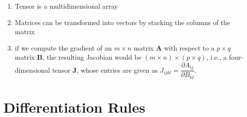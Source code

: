 \begin{enumerate}
    \item
    \begin{definition}[Tensor]
        Tensor is a multidimensional array
        \hfill \cite{mfml/book/mml/Deisenroth-Faisal-Ong}
    \end{definition}

    \item
    \begin{definition}
        Matrices can be transformed into vectors by stacking the columns of the matrix
        \hfill \cite{mfml/book/mml/Deisenroth-Faisal-Ong}
    \end{definition}

    \item if we compute the gradient of an $m \times  n$ matrix $\bm{A}$ with respect to a $p \times  q$ matrix $\bm{B}$, the resulting Jacobian would be $(m\times n)\times (p\times q)$, i.e., a four-dimensional tensor $\bm{J}$, whose entries are given as $J_{ijkl} = \dfrac{\partial A_{ij}}{\partial B_{kl}}$.
    \hfill \cite{mfml/book/mml/Deisenroth-Faisal-Ong}
\end{enumerate}










\section{Differentiation Rules}

